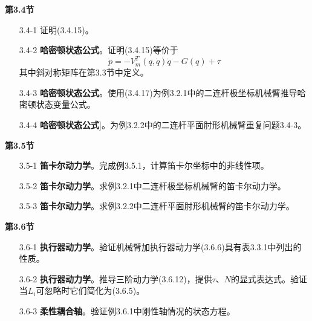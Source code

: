\documentclass[12pt,a4paper]{ctexart}
\begin{document}
\textbf{第3.4节}

\begin{enumerate}
\item[3.4-1] 证明(3.4.15)。

\item[3.4-2] \textbf{哈密顿状态公式}。证明(3.4.15)等价于
\[ \dot{p} = -V_m^T(q,\dot{q})\dot{q} - G(q) + \tau \]
其中斜对称矩阵在第3.3节中定义。

\item[3.4-3] \textbf{哈密顿状态公式}。使用(3.4.17)为例3.2.1中的二连杆极坐标机械臂推导哈密顿状态变量公式。

\item[3.4-4] \textbf{哈密顿状态公式}]。为例3.2.2中的二连杆平面肘形机械臂重复问题3.4-3。
\end{enumerate}

\textbf{第3.5节}

\begin{enumerate}
\item[3.5-1] \textbf{笛卡尔动力学}。完成例3.5.1，计算笛卡尔坐标中的非线性项。

\item[3.5-2] \textbf{笛卡尔动力学}。求例3.2.1中二连杆极坐标机械臂的笛卡尔动力学。

\item[3.5-3] \textbf{笛卡尔动力学}。求例3.2.2中二连杆平面肘形机械臂的笛卡尔动力学。
\end{enumerate}

\textbf{第3.6节}

\begin{enumerate}
\item[3.6-1] \textbf{执行器动力学}。验证机械臂加执行器动力学(3.6.6)具有表3.3.1中列出的性质。

\item[3.6-2] \textbf{执行器动力学}。推导三阶动力学(3.6.12)，提供$\tau$、$N$的显式表达式。验证当$L_i$可忽略时它们简化为(3.6.5)。

\item[3.6-3] \textbf{柔性耦合轴}。验证例3.6.1中刚性轴情况的状态方程。
\end{enumerate}
\end{document}
